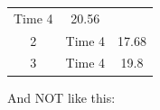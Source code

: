 \documentclass[]{article}
\theoremstyle{definition}
\theoremstyle{definition}
\theoremstyle{definition}
\theoremstyle{remark}
\begin{document}
\begin{longtable}[]{@{}ccc@{}}
\begin{minipage}[t]{0.11\columnwidth}
Time 4\strut
\end{minipage} & \begin{minipage}[t]{0.11\columnwidth}\centering\strut
20.56\strut
\end{minipage}\tabularnewline
\begin{minipage}[t]{0.11\columnwidth}\centering\strut
2\strut
\end{minipage} & \begin{minipage}[t]{0.11\columnwidth}\centering\strut
Time 4\strut
\end{minipage} & \begin{minipage}[t]{0.11\columnwidth}\centering\strut
17.68\strut
\end{minipage}\tabularnewline
\begin{minipage}[t]{0.11\columnwidth}\centering\strut
3\strut
\end{minipage} & \begin{minipage}[t]{0.11\columnwidth}\centering\strut
Time 4\strut
\end{minipage} & \begin{minipage}[t]{0.11\columnwidth}\centering\strut
19.8\strut
\end{minipage}\tabularnewline
\bottomrule
\end{longtable}

And NOT like this:
\end{document}
